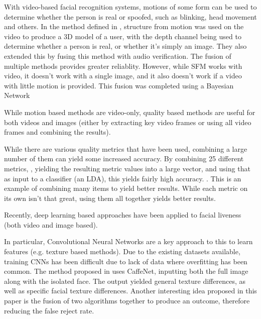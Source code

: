 \documentclass[10pt,a4paper]{article}
\begin{document}
        With video-based facial recognition systems, motions of some form can be used to determine whether the person is real or spoofed, such as blinking, head movement and others.
        In the method defined in \cite{SFMClassifier}, structure from motion was used on the video to produce a 3D model of a user, with the depth channel being used to determine whether a person is real, or whether it's simply an image.
        They also extended this by fusing this method with audio verification. The fusion of multiple methods provides greater reliablity. However, while SFM works with video, it doesn't work with a single image,
        and it also doesn't work if a video with little motion is provided. This fusion was completed using a Bayesian Network 

        While motion based methods are video-only, quality based methods are useful for both videos and images (either by extracting key video frames or using all video frames and combining the results).

        While there are various quality metrics that have been used, combining a large number of them can yield some increased accuracy. By combining 25 different metrics,
        , yielding the resulting metric values into a large vector, and using that as input to a classifier (an LDA), this yields fairly high accuracy. \cite{ImageQualityAssessmentTest}.
        This is an example of combining many items to yield better results. While each metric on its own isn't that great, using them all together yields better results.
        
        Recently, deep learning based approaches have been applied to facial liveness (both video and image based).

        In particular, Convolutional Neural Networks are a key approach to this to learn features (e.g. texture based methods).
        Due to the existing datasets available, training CNNs has been difficult due to lack of data where overfitting has been common.
        The method proposed in \cite{Patel2016CrossDatabaseFA} uses CaffeNet, inputting both the full image along with the isolated face.
        The output yielded general texture differences, as well as specific facial texture differences. Another interesting idea proposed
        in this paper is the fusion of two algorithms together to produce an outcome, therefore reducing the false reject rate.
        
\end{document}
